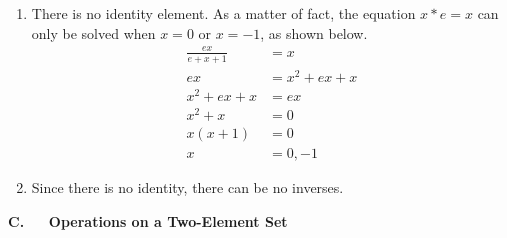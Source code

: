 \documentclass[twoside]{amsart}
\begin{document}
\begin{enumerate}[label=\protect{\textbf{\arabic*}}, leftmargin=1em]
\begin{enumerate}
  \item There is no identity element. As a matter of fact, the
    equation $x * e = x$ can only be solved when $x = 0$ or $x = -1$,
    as shown below.
    \begin{align*}
         \frac{ex}{e + x + 1} & = x \\
	 ex                   & = x^2 + ex + x \\
	 x^2 + ex + x         & = ex \\
	 x^2 + x              & = 0 \\
	 x(x+1)               & = 0 \\
	 x                    & = 0, -1
    \end{align*}

  \item Since there is no identity, there can be no inverses.
  \end{enumerate}
\end{enumerate}

\noindent \large\textbf{C. $\quad$ Operations on a Two-Element Set}
\end{document}
